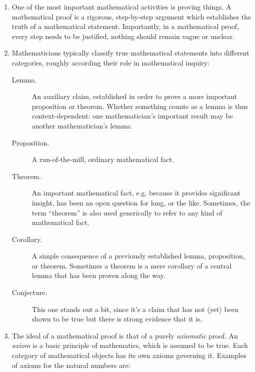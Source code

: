 \begin{enumerate}[{\thesection}.1]
	
	\item One of the most important mathematical activities is proving things. A mathematical proof is a rigorous, step-by-step argument which establishes the truth of a mathematical statement. Importantly, in a mathematical proof, every step needs to be justified, nothing should remain vague or unclear. 
	
		\item Mathematicians typically classify true mathematical statements into  different categories, roughly according their role in mathematical inquiry: 
		
		\begin{description}
							
			\item[Lemma.] An auxiliary claim, established in order to prove a more important proposition or theorem. Whether something counts as a lemma is thus context-dependent: one mathematician's important result may be another mathematician's lemma.
						
			\item[Proposition.] A run-of-the-mill, ordinary mathematical fact.
			
			\item[Theorem.] An important mathematical fact, e.g. because it provides significant insight, has been an open question for long, or the like. Sometimes, the term ``theorem'' is also used generically to refer to any kind of mathematical fact.
			
			\item[Corollary.] A simple consequence of a previously established lemma, proposition, or theorem. Sometimes a theorem is a mere corollary of a central lemma that has been proven along the way. 
			
			\item[Conjecture.] This one stands out a bit, since it's a claim that has not (yet) been shown to be true but there is strong evidence that it is. 
		
		\end{description}
		
	\item The ideal of a mathematical proof is that of a purely \emph{axiomatic} proof. An \emph{axiom} is a basic principle of mathematics, which is assumed to be true. Each category of mathematical objects has its own axioms governing it. Examples of axioms for the natural numbers are: 
	\begin{itemize}
	

\end{itemize}
\end{enumerate}

